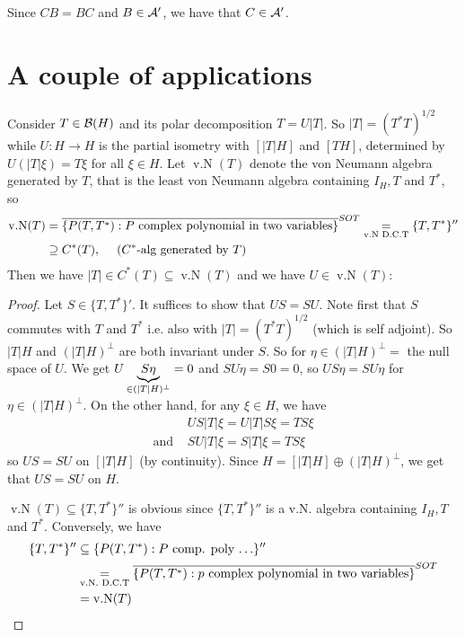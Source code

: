 \documentclass[10pt,english,a4paper]{article}
\theoremstyle{definition}
\let\emph\relax %
\DeclareMathOperator{\vN}{v.N}
\begin{document}
Since $CB = BC$ and $B \in \mathcal{A}'$, we have that $C \in \mathcal{A}'$.

\section{A couple of applications}
Consider $T \in \mathcal{B}(H)$ and its polar decomposition $T = U|T|$. So 
$|T| = (T^*T)^{1/2}$ while $U\colon H\to H$ is the partial isometry 
with \emph{initial space} $[|T|H]$ and \emph{final space} $[TH]$, determined
by $U(|T|\xi) = T\xi$ for all $\xi \in H$.
Let $\vN(T)$ denote the von Neumann algebra generated by $T$, 
that is the least von Neumann algebra containing $I_H, T$ and $T^*$,
so 
\begin{align*}
 \vN(T) &= \ol{\{P(T,T^*): P \text{ complex polynomial in two variables}\}}^{SOT} 
\underset{\text{v.N D.C.T}}{=} \{T,T^*\}''  \\
&\supseteq C^*(T),\quad \text{ ($C^*$-alg generated by $T$)}
\end{align*}
Then we have $|T| \in C^*(T)\subseteq \vN(T)$ 
and we have $U \in \vN(T)$:
\begin{proof}
    Let $S \in \{T,T^*\}'$. It suffices to show that $US=SU$.
Note first that $S$ commutes with $T$ and $T^*$ i.e. also with 
$|T| = (T^*T)^{1/2}$ (which is self adjoint).
So $|T|H$ and $(|T|H)^{\perp}$ are both invariant 
under $S$. So for $\eta \in (|T|H)^{\perp}=$ the null space of $U$.
We get $U\underbrace{S\eta}_{\in(|T|H)^{\perp}} = 0$ and 
$SU\eta = S0 = 0$, so $US\eta = SU\eta$ for $\eta \in (|T|H)^{\perp}$.
On the other hand, for any $\xi \in H$, we have 
\begin{align*}
&US|T|\xi = U|T|S\xi = TS\xi \\
\text{and }&     
SU|T|\xi = S|T|\xi = TS\xi 
\end{align*}
so $US=SU$ on $[|T|H]$ (by continuity). 
Since $H = [|T|H] \oplus (|T|H)^{\perp}$, we get that 
$US=SU$ on $H$.

$\vN(T)\subseteq \{T,T^*\}''$ is obvious since
$\{T,T^*\}''$ is a v.N. algebra containing $I_H, T$ and $T^*$.
Conversely, we have
\begin{align*}
\{T,T^*\}'' &\subseteq \{ P(T,T^*) : P\text{ comp. poly $\ldots$}\}'' \\
&\underset{\text{v.N. D.C.T}}{=}  
\ol{\{P(T,T^*): p \text{ complex polynomial in two variables}\}}^{SOT} \\
&= \vN(T)
\end{align*}
\end{proof}
\end{document}
